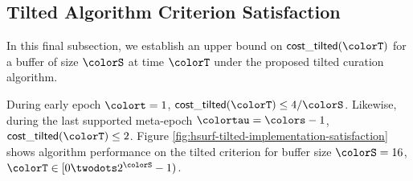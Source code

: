 \subsection{Tilted Algorithm Criterion Satisfaction}
\label{sec:tilted-satisfaction}

In this final subsection, we establish an upper bound on $\mathsf{cost\_tilted}(\colorT)$ for a buffer of size $\colorS$ at time $\colorT$ under the proposed tilted curation algorithm.



During early epoch $\colort = 1$, $\mathsf{cost\_tilted}(\colorT) \leq 4/\colorS$.
Likewise, during the last supported meta-epoch $\colortau = \colors - 1$, $\mathsf{cost\_tilted}(\colorT) \leq 2$.
Figure \ref{fig:hsurf-tilted-implementation-satisfaction} shows algorithm performance on the tilted criterion for buffer size $\colorS=16$, $\colorT \in [0\twodots 2^{\colorS} - 1)$.
